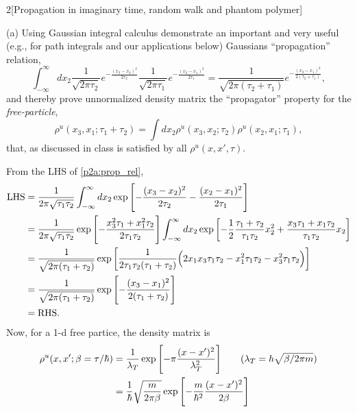 \documentclass[12pt]{article}
\begin{document}
\begin{problem}{2}[Propagation in imaginary time, random walk and phantom
    polymer]

(a) Using Gaussian integral calculus demonstrate an important and very useful
(e.g., for path integrals and our applications below) Gaussians ``propagation''
relation,
\begin{equation}\label{p2a:prop_rel}
    \int_{-\infty}^\infty
    dx_2\frac1{\sqrt{2\pi\tau_2}}e^{-\frac{(x_3-x_2)^2}{2\tau_2}}
    \frac1{\sqrt{2\pi\tau_1}}e^{-\frac{(x_2-x_1)^2}{2\tau_1}}
    =\frac1{\sqrt{2\pi(\tau_2+\tau_1)}}e^{-\frac{(x_3-x_1)^2}{2(\tau_2+\tau_1)}},
\end{equation}
and thereby prove unnormalized density matrix the ``propagator'' property for
the \textit{free-particle},
\begin{equation}\label{p2a:prop_property}
    \rho^u(x_3,x_1;\tau_1+\tau_2)
    =\int dx_2\rho^u(x_3,x_2;\tau_2)\rho^u(x_2,x_1;\tau_1),
\end{equation}
that, as discussed in class is satisfied by all $\rho^u(x,x',\tau)$.
\begin{solution}
From the LHS of \eqref{p2a:prop_rel},
\begin{align}
    \text{LHS}
    &=\frac1{2\pi\sqrt{\tau_1\tau_2}}\int_{-\infty}^\infty dx_2
    \exp\qty[-\frac{(x_3-x_2)^2}{2\tau_2}-\frac{(x_2-x_1)^2}{2\tau_1}]\notag\\
    &=\frac1{2\pi\sqrt{\tau_1\tau_2}}\exp\qty[-\frac{x_3^2\tau_1+x_1^2\tau_2}{2\tau_1\tau_2}]
    \int_{-\infty}^\infty
    dx_2\exp\qty[-\frac12\frac{\tau_1+\tau_2}{\tau_1\tau_2}x_2^2+\frac{x_3\tau_1+x_1\tau_2}{\tau_1\tau_2}x_2]\notag\\
    &=\frac1{\sqrt{2\pi(\tau_1+\tau_2)}}\exp\qty[\frac1{2\tau_1\tau_2(\tau_1+\tau_2)}\qty(2x_1x_3\tau_1\tau_2-x_1^2\tau_1\tau_2-x_3^2\tau_1\tau_2)]\notag\\
    &=\frac1{\sqrt{2\pi(\tau_1+\tau_2)}}\exp\qty[-\frac{(x_3-x_1)^2}{2(\tau_1+\tau_2)}]\notag\\
    &=\text{RHS}.
\end{align}
Now, for a 1-d free partice, the density matrix is
\begin{align}
    \rho^u(x,x';\beta=\tau/\hbar)
    &=\frac1{\lambda_T}\exp\qty[-\pi\frac{(x-x')^2}{\lambda_T^2}]
        \tag{$\lambda_T=h\sqrt{\beta/2\pi m}$}\\
    &=\frac1{\hbar}\sqrt{\frac{m}{2\pi\beta}}
    \exp\qty[-\frac{m}{\hbar^2}\frac{(x-x')^2}{2\beta}]\notag\\

\end{align}
\end{solution}
\end{problem}
\end{document}
